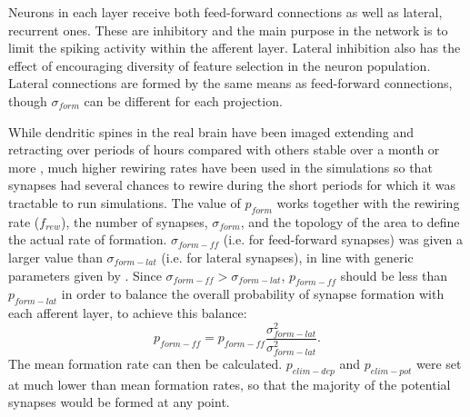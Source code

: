 \documentclass[sigconf]{acmart}
\begin{document}
Neurons in each layer receive both feed-forward connections as well as lateral, recurrent ones.
These are inhibitory and the main purpose in the network is to limit the spiking activity within the afferent layer. 
Lateral inhibition also has the effect of encouraging diversity of feature selection in the neuron population.
Lateral connections are formed by the same means as feed-forward connections, though $\sigma_{form}$ can be different for each projection.

While dendritic spines in the real brain have been imaged extending and retracting over periods of hours compared with others stable over a month or more \cite{Grutzendler2002}, 
much higher rewiring rates have been used in the simulations so that synapses had several chances to rewire during the short periods for which it was tractable to run simulations.
The value of $p_{form}$ works together with the rewiring rate ($f_{rew}$), the number of synapses, $\sigma_{form}$, and the topology of the area to define the actual rate of formation.
$\sigma_{form-ff}$ (i.e. for feed-forward synapses) was given a larger value than $\sigma_{form-lat}$ (i.e. for lateral synapses), in line with generic parameters given by \cite{miikkulainen2006computational}.
Since $\sigma_{form-ff} > \sigma_{form-lat}$, $p_{form-ff}$ should be less than $p_{form-lat}$ in order to balance the overall probability of synapse formation with each afferent layer, to achieve this balance:
\begin{equation}
    p_{form-ff} = p_{form-ff} \frac{\sigma^2_{form-lat}}{\sigma^2_{form-lat}}.
\end{equation}
The mean formation rate can then be calculated. 
$p_{elim-dep}$ and $p_{elim-pot}$ were set at much lower than mean formation rates, so that the majority of the potential synapses would be formed at any point.
\end{document}
